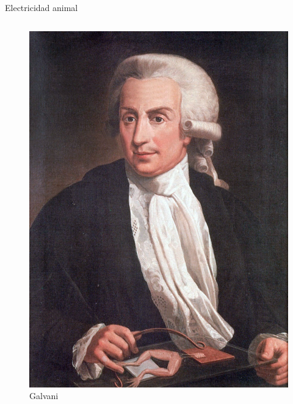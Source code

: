 \documentclass{beamer}
\begin{document}
\begin{frame}{Electricidad animal}
    \transfade
    \begin{columns}
    \begin{column}{0.5\textwidth}
        \begin{figure}
            \centering
            \includegraphics[width=0.9\linewidth]{galvani1.jpg}
            \caption{Galvani}
            \label{fig:my_label}
        \end{figure}
    \end{column}
    \pause
    

\end{columns}
\end{frame}
\end{document}
